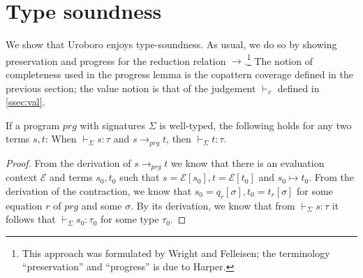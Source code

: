 \section{Type soundness}
\label{sec:urots}

We show that Uroboro enjoys type-soundness. As usual, we do so by showing preservation and progress for the reduction relation $\longrightarrow$.\footnote{This approach was formulated by Wright and Felleisen\cite{wright94syntactic}; the terminology ``preservation'' and ``progress'' is due to Harper.} The notion of completeness used in the progress lemma is the copattern coverage defined in the previous section; the value notion is that of the judgement $\vdash_v$ defined in \autoref{ssec:val}.

\begin{lemma}
If a program $prg$ with signatures $\Sigma$ is well-typed, the following holds for any two terms $s, t$: When $\vdash_{\Sigma} s : \tau$ and $s \longrightarrow_{prg} t$, then $\vdash_{\Sigma} t : \tau$.
\begin{proof}
From the derivation of $s \longrightarrow_{prg} t$ we know that there is an evaluation context $\mathcal{E}$ and terms $s_0, t_0$ such that $s = \mathcal{E}[s_0], t = \mathcal{E}[t_0]$ and $s_0 \mapsto t_0$. From the derivation of the contraction, we know that $s_0 = q_r[\sigma], t_0 = t_r[\sigma]$ for some equation $r$ of $prg$ and some $\sigma$.  By its derivation, we know that from $\vdash_{\Sigma} s : \tau$ it follows that $\vdash_{\Sigma} s_0 : \tau_0$ for some type $\tau_0$.



\end{proof}
\end{lemma}
